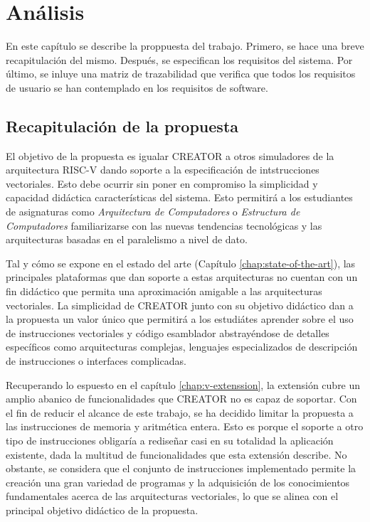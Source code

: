 \chapter{Análisis}\label{chap:analysis}
En este capítulo se describe la proppuesta del trabajo. Primero, se hace una
breve recapitulación del mismo. Después, se especifican los requisitos del
sistema. Por último, se inluye una matriz de trazabilidad que verifica que
todos los requisitos de usuario se han contemplado en los requisitos de
software.

\section{Recapitulación de la propuesta}

El objetivo de la propuesta es igualar CREATOR a otros simuladores de la
arquitectura RISC-V dando soporte a la especificación de intstrucciones
vectoriales. Esto debe ocurrir sin poner en compromiso la simplicidad y
capacidad didáctica características del sistema. Esto permitirá a los
estudiantes de asignaturas como \textit{Arquitectura de Computadores} o
\textit{Estructura de Computadores} familiarizarse con las nuevas tendencias
tecnológicas y las arquitecturas basadas en el paralelismo a nivel de dato.

Tal y cómo se expone en el estado del arte (Capítulo \ref{chap:state-of-the-art}), las
principales plataformas que dan soporte a estas arquitecturas no cuentan con un
fin didáctico que permita una aproximación amigable a las arquitecturas
vectoriales. La simplicidad de CREATOR junto con su objetivo didáctico dan a la
propuesta un valor único que permitirá a los estudiátes aprender sobre el uso
de instrucciones vectoriales y código esamblador abstrayéndose de detalles
específicos como arquitecturas complejas, lenguajes especializados de
descripción de instrucciones o interfaces complicadas.

Recuperando lo espuesto en el capítulo \ref{chap:v-extenssion}, la extensión cubre
un amplio abanico de funcionalidades que CREATOR no es capaz de soportar. Con
el fin de reducir el alcance de este trabajo, se ha decidido limitar la
propuesta a las instrucciones de memoria y aritmética entera. Esto es porque el
soporte a otro tipo de instrucciones obligaría a rediseñar casi en su totalidad
la aplicación existente, dada la multitud de funcionalidades que esta extensión
describe. No obstante, se considera que el conjunto de instrucciones
implementado permite la creación una gran variedad de programas y la
adquisición de los conocimientos fundamentales acerca de las arquitecturas
vectoriales, lo que se alinea con el principal objetivo didáctico de la propuesta.

